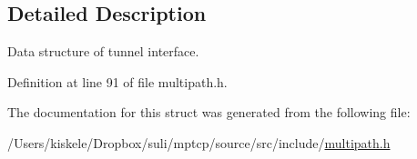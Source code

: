 \subsection{Detailed Description}
Data structure of tunnel interface. 

Definition at line 91 of file multipath.\-h.



The documentation for this struct was generated from the following file\-:\begin{DoxyCompactItemize}
\item 
/\-Users/kiskele/\-Dropbox/suli/mptcp/source/src/include/\hyperlink{multipath_8h}{multipath.\-h}\end{DoxyCompactItemize}
